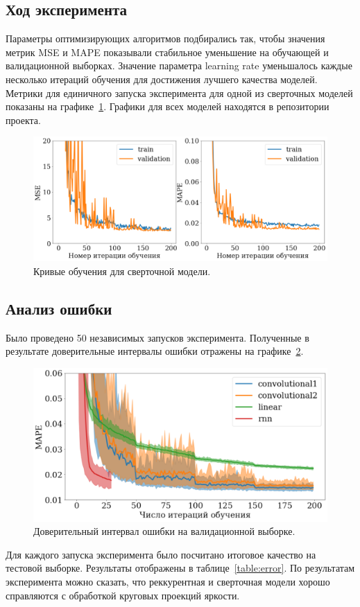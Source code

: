 \documentclass[12pt, twoside]{article}
\begin{document}
\subsection{Ход эксперимента}
Параметры оптимизирующих алгоритмов подбирались так, чтобы значения метрик MSE и MAPE показывали стабильное уменьшение на обучающей и валидационной выборках. Значение параметра learning rate уменьшалось каждые несколько итераций обучения для достижения лучшего качества моделей. Метрики для единичного запуска эксперимента для одной из сверточных моделей показаны на графике~\ref{fig:singleexp}. Графики для всех моделей находятся в репозитории проекта.
\begin{figure}[b]
	\centering
	\includegraphics[scale=0.4]{img/single_experiment.pdf}
	\caption{Кривые обучения для сверточной модели.}
	\label{fig:singleexp}
\end{figure}

\subsection{Анализ ошибки}
Было проведено 50 независимых запусков эксперимента. Полученные в результате доверительные интервалы ошибки отражены на графике~\ref{fig:multerr}.
\begin{figure}[b]
	\centering
	\includegraphics[scale=0.4]{img/multerror.pdf}
	\caption{Доверительный интервал ошибки на валидационной выборке.}
	\label{fig:multerr}
\end{figure}
Для каждого запуска эксперимента было посчитано итоговое качество на тестовой выборке. Результаты отображены в таблице~\ref{table:error}. По результатам эксперимента можно сказать, что реккурентная и сверточная модели хорошо справляются с обработкой круговых проекций яркости.
\end{document}
